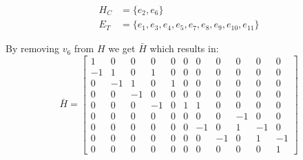 \begin{equation*} 
	\begin{split}
		H_{C} &= \{e_{2},e_{6}\}   \\ E_{T} &= \{e_1,e_3,e_4,e_5,e_7, e_8, e_9, e_{10} , e_{11}\}
	\end{split}
\end{equation*}	
	
	By removing $v_{6}$ from $H$ we get $\bar{H}$ which results in:
	\begin{equation}
		\bar{H} = \begin{bmatrix}
			1 & 0 & 0   & 0  & 0  & 0  & 0  & 0  & 0  & 0  & 0 \\
			-1 & 1 & 0  & 1  & 0  & 0  & 0  & 0  & 0  & 0  & 0 \\
			0 & -1 & 1  & 0  & 1  & 0  & 0  & 0  & 0  & 0  & 0 \\
			0 & 0  & -1 & 0  & 0  & 0  & 0  & 0  & 0  & 0  & 0 \\
			0 & 0  & 0  & -1 & 0  & 1  & 1  & 0  & 0  & 0  & 0 \\
			
			0 & 0  & 0  & 0  & 0  & 0  & 0  & 0  & -1 & 0  & 0 \\
			0 & 0  & 0  & 0  & 0  & 0  & -1 & 0  & 1  & -1 & 0 \\
			0 & 0  & 0  & 0  & 0  & 0  & 0  & -1 & 0  & 1  & -1 \\
			0 & 0  & 0  & 0  & 0  & 0  & 0  & 0  & 0  & 0  & 1 
		\end{bmatrix}
	\end{equation}
	
	
	
